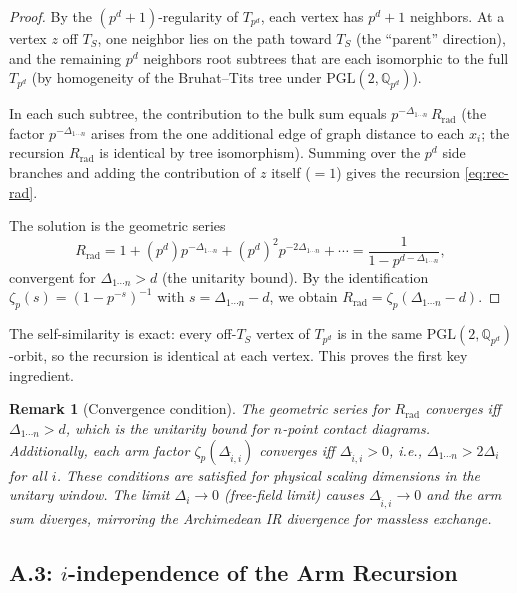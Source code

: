 \documentclass[11pt,a4paper]{article}
\newtheorem{remark}{Remark}
\newcommand{\PGL}{\mathrm{PGL}}
\begin{document}
\begin{proof}
By the $(p^d{+}1)$-regularity of $T_{p^d}$, each vertex has $p^d{+}1$ neighbors. At a vertex $z$ off $T_S$, one neighbor lies on the path toward $T_S$ (the ``parent'' direction), and the remaining $p^d$ neighbors root subtrees that are each isomorphic to the full $T_{p^d}$ (by homogeneity of the Bruhat--Tits tree under $\PGL(2, \mathbb{Q}_{p^d})$).

In each such subtree, the contribution to the bulk sum equals $p^{-\Delta_{1\cdots n}} \, R_{\mathrm{rad}}$ (the factor $p^{-\Delta_{1\cdots n}}$ arises from the one additional edge of graph distance to each $x_i$; the recursion $R_{\mathrm{rad}}$ is identical by tree isomorphism). Summing over the $p^d$ side branches and adding the contribution of $z$ itself ($= 1$) gives the recursion \eqref{eq:rec-rad}.

The solution is the geometric series
\begin{equation}
R_{\mathrm{rad}} = 1 + (p^d) p^{-\Delta_{1\cdots n}} + (p^d)^2 p^{-2\Delta_{1\cdots n}} + \cdots = \frac{1}{1 - p^{d - \Delta_{1\cdots n}}},
\end{equation}
convergent for $\Delta_{1\cdots n} > d$ (the unitarity bound). By the identification $\zeta_p(s) = (1 - p^{-s})^{-1}$ with $s = \Delta_{1\cdots n} - d$, we obtain $R_{\mathrm{rad}} = \zeta_p(\Delta_{1\cdots n} - d)$. \qedhere
\end{proof}

The self-similarity is exact: every off-$T_S$ vertex of $T_{p^d}$ is in the same $\PGL(2, \mathbb{Q}_{p^d})$-orbit, so the recursion is identical at each vertex. This proves the first key ingredient.

\begin{remark}[Convergence condition]
\label{rem:convergence}
The geometric series for $R_{\mathrm{rad}}$ converges iff $\Delta_{1\cdots n} > d$, which is the unitarity bound for $n$-point contact diagrams. Additionally, each arm factor $\zeta_p(\Delta_{\hat{i},i})$ converges iff $\Delta_{\hat{i},i} > 0$, i.e., $\Delta_{1\cdots n} > 2\Delta_i$ for all $i$. These conditions are satisfied for physical scaling dimensions in the unitary window. The limit $\Delta_i \to 0$ (free-field limit) causes $\Delta_{\hat{i},i} \to 0$ and the arm sum diverges, mirroring the Archimedean IR divergence for massless exchange.
\end{remark}

\subsection{A.3: $i$-independence of the Arm Recursion}
\end{document}
